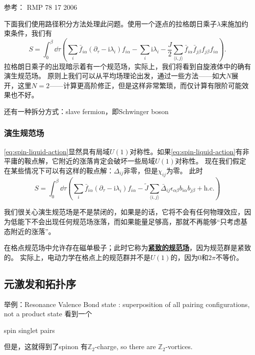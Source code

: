 \documentclass[hyperref, UTF8, a4paper]{ctexart}
\newcommand*{\ii}{\mathrm{i}}
\newcommand*{\pair}[1]{\langle #1 \rangle}
\newcommand*{\concept}[1]{\underline{\textbf{#1}}}
\begin{document}
参考： RMP 78 17 2006

下面我们使用路径积分方法处理此问题。使用一个逐点的拉格朗日乘子$\lambda$来施加约束条件，我们有
\begin{equation}
    S = \int_0^\beta \dd{\tau} \left( \sum_i \bar{f}_{i \alpha} (\partial_\tau - \ii \lambda_i) f_{i \alpha} - \sum_i \ii \lambda_i - \frac{J}{2} \sum_{\pair{i, j}} \bar{f}_{i \alpha} \bar{f}_{j \beta} f_{j \beta} f_{i \alpha} \right).
    \label{eq:spin-liquid-action}
\end{equation}
拉格朗日乘子的出现暗示着有一个规范场，实际上，我们将看到自旋液体中的确有演生规范场。
原则上我们可以从平均场理论出发，通过一些方法——如大$N$展开，这里$N=2$——计算更高阶修正，但是这样非常繁琐，而仅计算有限阶可能效果也不好。

还有一种拆分方式：slave fermion，即Schwinger boson

\subsubsection{演生规范场}

\eqref{eq:spin-liquid-action}显然具有局域$U(1)$对称性。如果\eqref{eq:spin-liquid-action}有非平庸的鞍点解，它附近的涨落肯定会破坏一些局域$U(1)$对称性。
现在我们假定在某些情况下可以有这样的鞍点解：$\Delta_{ij}$非零，但是$\chi_{ij}$为零。
此时
\begin{equation}
    S = \int_0^\beta \dd{\tau} \left( \sum_i \bar{f}_{i \alpha} (\partial_\tau - \ii \lambda_i) f_{i \alpha} - \tilde{J} \sum_{\pair{i, j}} \bar{\Delta}_{ij} \epsilon_{\alpha \beta} b_{i \alpha} b_{j \beta} + \text{h.c.} \right)
\end{equation}

我们很关心演生规范场是不是禁闭的，如果是的话，它将不会有任何物理效应，因为低能下不会出现任何规范场涨落，而如果能量足够高，那就不再能够“只考虑基态附近的涨落”。

在格点规范场中允许存在磁单极子；此时它称为\concept{紧致的规范场}，因为规范群是紧致的。
实际上，电动力学在格点上的规范群并不是$U(1)$的，因为$0$和$2\pi$不等价。

\subsection{元激发和拓扑序}

举例：Resonance Valence Bond state : superposition of all pairing configurations, not a product state
看到一个

spin singlet pairs

但是，这就得到了spinon
有$\mathbb{Z}_2$-charge, so there are $\mathbb{Z}_2$-vortices.
\end{document}

